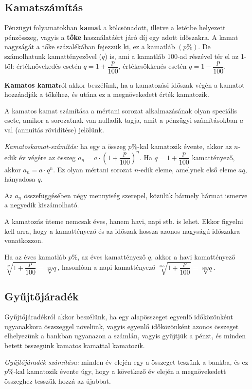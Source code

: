 \documentclass[12pt,a4paper]{article}
\begin{document}
\subsection{Kamatszámítás}
Pénzügyi folyamatokban \textbf{kamat} a kölcsönadott, illetve a letétbe helyezett pénzösszeg, vagyis a \textbf{tőke} használatáért járó díj egy adott időszakra. A kamat nagyságát a tőke százalékában fejezzük ki, ez a kamatláb $(p\%)$. De számolhatunk kamattényezővel ($q$) is, ami a kamatláb 100-ad részével tér el az 1-től: értéknövekedés esetén $q=1+\dfrac{p}{100}$, értékcsökkenés esetén $q=1-\dfrac{p}{100}$.

\textbf{Kamatos kamat}ról akkor beszélünk, ha a kamatozási időszak végén a kamatot hozzáadják a tőkéhez, és utána ez a megnövekedett érték kamatozik.

A kamatos kamat számítása a mértani sorozat alkalmazásának olyan speciális esete, amikor a sorozatnak van nulladik tagja, amit a pénzügyi számításokban $a$-val (annuitás rövidítése) jelölünk.

\textit{Kamatoskamat-számítás:} ha egy a összeg $p\%$-kal kamatozik évente, akkor az $n$-edik év végére az
összeg $a_n=a\cdot\left(1+\dfrac{p}{100} \right)^n$. Ha $q=1+\dfrac{p}{100}$ kamattényező, akkor $a_n = a \cdot q^n$. Ez olyan mértani sorozat $n$-edik eleme, amelynek első eleme $aq$, hányadosa $q$.

Az $a_n$ összefüggésében négy mennyiség szerepel, közülük bármely hármat ismerve a negyedik kiszámolható.

A kamatozás üteme nemcsak éves, hanem havi, napi stb. is lehet. Ekkor figyelni kell arra, hogy a kamattényező és az időszak hossza azonos nagyságú időszakra vonatkozzon.

Ha az éves kamatláb $p\%$, az éves kamattényező $q$, akkor a havi kamattényező $\sqrt[12]{1+\dfrac{p}{100}}=\sqrt[12]{q}$, hasonlóan a napi kamattényező $\sqrt[365]{1+\dfrac{p}{100}}=\sqrt[365]{q}$.

\subsection{Gyűjtőjáradék}
Gyűjtőjáradékról akkor beszélünk, ha egy alapösszeget egyenlő időközönként ugyanakkora öszszeggel növelünk, vagyis egyenlő időközönként azonos összeget elhelyezünk a bankban ugyanazon a számlán, vagyis gyűjtjük a pénzt, és minden betett összegünk kamatos kamattal kamatozik.

\textit{Gyűjtőjáradék számítása:} minden év elején egy a összeget teszünk a bankba, és ez $p\%$-kal kamatozik évente úgy, hogy a következő év elején a megnövekedett összeghez tesszük hozzá az újabbat.
\end{document}
